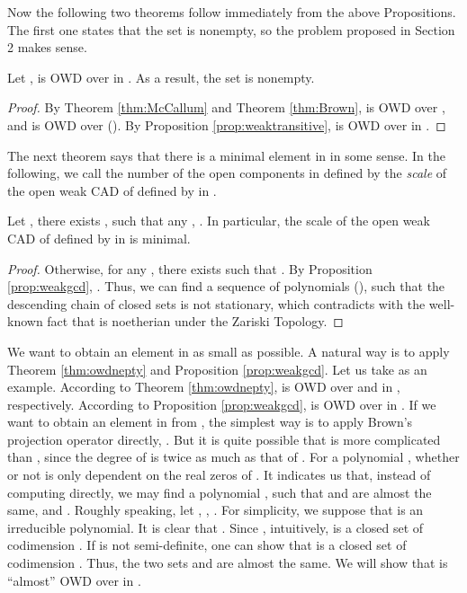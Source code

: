 \documentclass[amsthm]{elsart}
\begin{document}
Now the following two theorems follow immediately from the above Propositions. The first one states that the set 
 is nonempty, so the problem proposed in Section 2 makes sense. \begin{thm}\label{thm:owdnepty}
Let ,  is OWD over  in . As a result, the set  is nonempty.
\end{thm}
\begin{proof}
By Theorem \ref{thm:McCallum} and Theorem \ref{thm:Brown},  is OWD over , and  is OWD over  (). By Proposition \ref{prop:weaktransitive},  is OWD over  in .
\end{proof}
The next theorem says that there is a minimal element in  in some sense.
 In the following, we call the number of the open components in  defined by 
 the {\em scale} of the open weak CAD of  defined by  in .
\begin{thm}
Let , there exists , such that any , . In particular, the scale of the open weak CAD of  defined by  in  is minimal.
\end{thm}
\begin{proof}
  Otherwise, for any , there exists  such that . By Proposition \ref{prop:weakgcd}, . Thus, we can find a sequence of polynomials  (), such that the descending chain of closed sets  is not stationary, which contradicts with the well-known fact that  is noetherian under the Zariski Topology.
\end{proof}

We want to obtain an element in  as small as possible. A natural way is to apply Theorem \ref{thm:owdnepty} and Proposition \ref{prop:weakgcd}. Let us take  as an example. According to Theorem \ref{thm:owdnepty},  is OWD over  and  in , respectively. According to Proposition \ref{prop:weakgcd},  is OWD over  in .
If we want to obtain an element in  from , the simplest way is to apply Brown's projection operator directly, . But it is quite possible that  is more complicated than , since the degree of  is twice as much as that of .
For a polynomial , whether  or not is only dependent on the real zeros of . It indicates us that, instead of computing  directly, we may find a polynomial , such that  and  are almost the same, and . Roughly speaking, let , , . For simplicity, we suppose that  is an irreducible polynomial. It is clear that . Since , intuitively,  is a closed set of codimension . If  is not semi-definite, one can show that  is a closed set of codimension . Thus, the two sets  and  are almost the same. We will show that  is ``almost'' OWD over  in .
\end{document}
